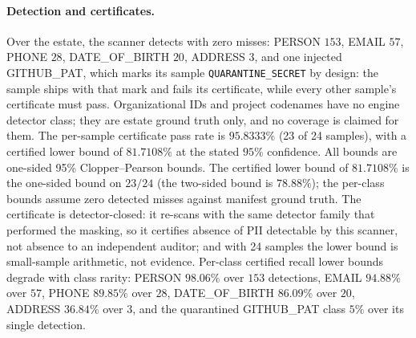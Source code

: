 \documentclass{article}
\begin{document}
\paragraph{Detection and certificates.}
Over the estate, the scanner detects with zero misses: PERSON $153$, EMAIL $57$, PHONE $28$, DATE\_OF\_BIRTH $20$, ADDRESS $3$, and one injected GITHUB\_PAT, which marks its sample \texttt{QUARANTINE\_SECRET} by design: the sample ships with that mark and fails its certificate, while every other sample's certificate must pass. Organizational IDs and project codenames have no engine detector class; they are estate ground truth only, and no coverage is claimed for them. The per-sample certificate pass rate is $95.8333\%$ (23 of 24 samples), with a certified lower bound of $81.7108\%$ at the stated $95\%$ confidence. All bounds are one-sided 95\% Clopper--Pearson bounds. The certified lower bound of $81.7108\%$ is the one-sided bound on $23/24$ (the two-sided bound is $78.88\%$); the per-class bounds assume zero detected misses against manifest ground truth. The certificate is detector-closed: it re-scans with the same detector family that performed the masking, so it certifies absence of PII detectable by this scanner, not absence to an independent auditor; and with 24 samples the lower bound is small-sample arithmetic, not evidence. Per-class certified recall lower bounds degrade with class rarity: PERSON $98.06\%$ over $153$ detections, EMAIL $94.88\%$ over $57$, PHONE $89.85\%$ over $28$, DATE\_OF\_BIRTH $86.09\%$ over $20$, ADDRESS $36.84\%$ over $3$, and the quarantined GITHUB\_PAT class $5\%$ over its single detection.
\end{document}

